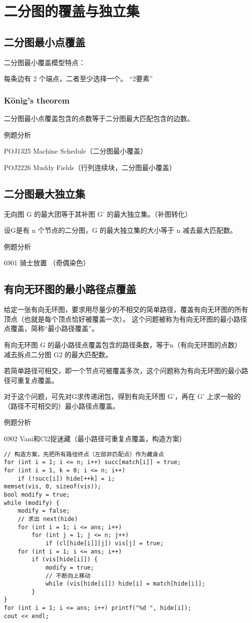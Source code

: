 \section{二分图的覆盖与独立集}
\subsection{二分图最小点覆盖}
二分图最小覆盖模型特点：

每条边有 2 个端点，二者至少选择一个。  “2要素”
\subsubsection{König's theorem}
二分图最小点覆盖包含的点数等于二分图最大匹配包含的边数。

例题分析

POJ1325 Machine Schedule（二分图最小覆盖）

POJ2226 Muddy Fields（行列连续块，二分图最小覆盖）

\subsection{二分图最大独立集}

无向图 G 的最大团等于其补图 G' 的最大独立集。（补图转化）

设G是有 n 个节点的二分图，G 的最大独立集的大小等于 n 减去最大匹配数。

例题分析

6901 骑士放置 （奇偶染色）

\subsection{有向无环图的最小路径点覆盖}
给定一张有向无环图，要求用尽量少的不相交的简单路径，覆盖有向无环图的所有顶点（也就是每个顶点恰好被覆盖一次）。
这个问题被称为有向无环图的最小路径点覆盖，简称“最小路径覆盖”。

有向无环图 G 的最小路径点覆盖包含的路径条数，等于n（有向无环图的点数）减去拆点二分图 G2 的最大匹配数。

若简单路径可相交，即一个节点可被覆盖多次，这个问题称为有向无环图的最小路径可重复点覆盖。

对于这个问题，可先对G求传递闭包，得到有向无环图 G'，再在 G' 上求一般的（路径不可相交的）最小路径点覆盖。

例题分析

6902 Vani和Cl2捉迷藏（最小路径可重复点覆盖，构造方案）
\begin{lstlisting}
// 构造方案，先把所有路径终点（左部非匹配点）作为藏身点
for (int i = 1; i <= n; i++) succ[match[i]] = true;
for (int i = 1, k = 0; i <= n; i++)
    if (!succ[i]) hide[++k] = i;
memset(vis, 0, sizeof(vis));
bool modify = true;
while (modify) {
    modify = false;
    // 求出 next(hide)
    for (int i = 1; i <= ans; i++) 
        for (int j = 1; j <= n; j++)
            if (cl[hide[i]][j]) vis[j] = true;
    for (int i = 1; i <= ans; i++)
        if (vis[hide[i]]) {
            modify = true;
            // 不断向上移动
            while (vis[hide[i]]) hide[i] = match[hide[i]];
        }
}
for (int i = 1; i <= ans; i++) printf("%d ", hide[i]);
cout << endl;
\end{lstlisting}